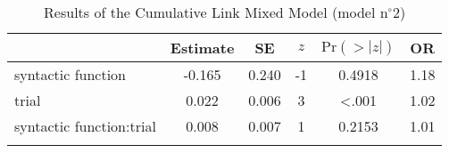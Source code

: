 \begin{table}
\begin{tabular}{l S[table-format=-1.3] S[table-format=1.3] S[table-format=-1.0] S[table-format=<1.4] S[table-format=1.2]}
  \lsptoprule
 & {Estimate} & {SE} & {$z$} & {$\text{Pr}(>|z|)$} & {OR} \\ 
  \midrule
  syntactic function       & -0.165 & 0.240 & -1 & 0.4918 & 1.18 \\ 
  trial                    & 0.022 & 0.006 & 3 & <.001 & 1.02 \\ 
  syntactic function:trial & 0.008 & 0.007 & 1 & 0.2153 & 1.01 \\ 
   \lspbottomrule
\end{tabular}
\caption{Results of the Cumulative Link Mixed Model (model n$^{\circ}$2)}
\label{tab:exp13-m2}
\end{table}
